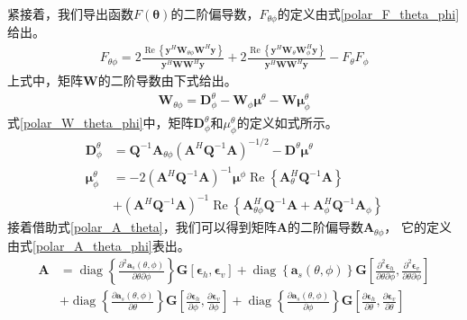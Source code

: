 \documentclass[master]{thesis-uestc}
\begin{document}
紧接着，我们导出函数$F(\bm{\theta})$的二阶偏导数，$F_{\theta\phi}$的定义由式\eqref{polar_F_theta_phi}给出。
\begin{equation}\label{polar_F_theta_phi}
    \begin{aligned}
        F_{\theta\phi} = 
        2\frac{\operatorname{Re}\left\{\bm{y}^H\bm{W}_{\theta\phi}\bm{W}^H\bm{y}\right\}}
        {\bm{y}^H\bm{W}\bm{W}^H\bm{y}} + 
        2\frac{\operatorname{Re}\left\{\bm{y}^H\bm{W}_{\theta}\bm{W}^H_\phi\bm{y}\right\}}
        {\bm{y}^H\bm{W}\bm{W}^H\bm{y}} - F_\theta F_\phi
    \end{aligned}
\end{equation}
上式中，矩阵$\bm{W}$的二阶导数由下式给出。
\begin{equation}\label{polar_W_theta_phi}
    \begin{aligned}
        \bm{W}_{\theta\phi} = \bm{D}_\phi^\theta - \bm{W}_\phi\bm{\mu}^\theta - \bm{W}\bm{\mu}^\theta_\phi
    \end{aligned}
\end{equation}
式\eqref{polar_W_theta_phi}中，矩阵$\bm{D}^\theta_\phi$和$\mu^\theta_\phi$的定义如式所示。
\begin{subequations}
    \begin{align}
        \bm{D}^\theta_\phi &= \bm{Q}^{-1}\bm{A}_{\theta\phi}
        \left(\bm{A}^H\bm{Q}^{-1}\bm{A}\right)^{-1/2} - \bm{D}^\theta\bm{\mu}^\theta \\
        \bm{\mu}^\theta_\phi &= 
        -2\left(\bm{A}^H\bm{Q}^{-1}\bm{A}\right)^{-1}\bm{\mu}^\phi
        \operatorname{Re}\left\{\bm{A}^H_\theta\bm{Q}^{-1}\bm{A}\right\} \\ &+  
        \left(\bm{A}^H\bm{Q}^{-1}\bm{A}\right)^{-1}
        \operatorname{Re}\left\{\bm{A}^H_{\theta\phi}\bm{Q}^{-1}\bm{A} + \bm{A}^H_\phi\bm{Q}^{-1}\bm{A}_\phi\right\}
    \end{align}
\end{subequations}
接着借助式\eqref{polar_A_theta}，我们可以得到矩阵$\bm{A}$的二阶偏导数$\bm{A}_{\theta\phi}$，
它的定义由式\eqref{polar_A_theta_phi}表出。
\begin{equation}\label{polar_A_theta_phi}
    \begin{aligned}
        \bm{A} &= \operatorname{diag}\left\{\frac{\partial^2\bm{a}_s(\theta,\phi)}{\partial\theta\partial\phi}\right\}
        \bm{G}\left[\bm{\epsilon}_h,\bm{\epsilon}_v\right] + 
        \operatorname{diag}\left\{\bm{a}_s(\theta,\phi)\right\}\bm{G}
        \left[
            \frac{\partial^2\bm{\epsilon}_h}{\partial\theta\partial\phi},
            \frac{\partial^2\bm{\epsilon}_v}{\partial\theta\partial\phi}
        \right] \\ &+ 
        \operatorname{diag}\left\{\frac{\partial\bm{a}_s(\theta,\phi)}{\partial\theta}\right\}\bm{G}
        \left[
            \frac{\partial\bm{\epsilon}_h}{\partial\phi},
            \frac{\partial\bm{\epsilon}_v}{\partial\phi}
        \right] + 
        \operatorname{diag}\left\{\frac{\partial\bm{a}_s(\theta,\phi)}{\partial\phi}\right\}\bm{G}
        \left[
            \frac{\partial\bm{\epsilon}_h}{\partial\theta},
            \frac{\partial\bm{\epsilon}_v}{\partial\theta}
        \right]
    \end{aligned}
\end{equation}
\end{document}
